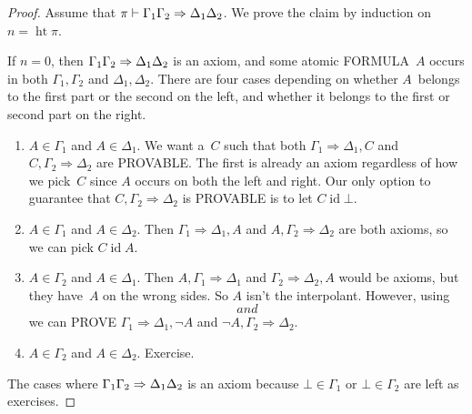 \documentclass[10pt,a4paper]{article}
\newcommand*{\olup}[1]{\MakeUppercase{#1}}
\theoremstyle{plain}
\theoremstyle{definition}
\theoremstyle{remark}
\providecommand{\lfalse}{\bot}
\providecommand{\Sequent}{\mathrel{\Rightarrow}}
\providecommand{\Proves}{\mathrel{\vdash}}
\providecommand{\LeftR}[1]{}
\providecommand{\RightR}[1]{}
\providecommand{\maeh}{\relax}
\providecommand{\pheight}{\operatorname{ht}}
\providecommand{\RightR}{\mathrm{R}}
\providecommand{\LeftR}{\mathrm{L}}
\providecommand{\ident}{\operatorname{id}}
\begin{document}
\begin{proof}
  Assume that $\pi \Proves \maeh{\Gamma_1}{\Gamma_2} \Sequent
  \maeh{\Delta_1}{\Delta_2}$. We prove the claim by induction on
  $n=\pheight{\pi}$.

  If $n=0$, then $\maeh{\Gamma_1}{\Gamma_2} \Sequent
  \maeh{\Delta_1}{\Delta_2}$ is an axiom, and some atomic
  \olup{formula}~$A$ occurs in both $\Gamma_1, \Gamma_2$ and $\Delta_1,
  \Delta_2$. There are four cases depending on whether $A$~belongs to
  the first part or the second on the left, and whether it belongs to
  the first or second part on the right.
  \begin{enumerate}
    \item $A \in \Gamma_1$ and $A \in \Delta_1$. We want a~$C$ such
    that both $\Gamma_1 \Sequent \Delta_1, C$ and $C, \Gamma_2
    \Sequent \Delta_2$ are \olup{provable}. The first is already an axiom
    regardless of how we pick~$C$ since $A$ occurs on both the left
    and right. Our only option to guarantee that $C, \Gamma_2
    \Sequent \Delta_2$ is \olup{provable} is to let $C \ident \lfalse$.
    \item $A \in \Gamma_1$ and $A \in \Delta_2$. Then $\Gamma_1
    \Sequent \Delta_1, A$ and $A, \Gamma_2 \Sequent \Delta_2$ are
    both axioms, so we can pick $C \ident A$.
    \item $A \in \Gamma_2$ and $A \in \Delta_1$. Then $A, \Gamma_1
    \Sequent \Delta_1$ and $\Gamma_2 \Sequent \Delta_2, A$ would be 
    axioms, but they have~$A$ on the wrong sides. So $A$ isn't the
    interpolant. However, using $\RightR{\lnot}$ and $\LeftR{\lnot}$
    we can \olup{prove} $\Gamma_1
    \Sequent \Delta_1, \lnot A$ and $\lnot A, \Gamma_2 \Sequent
    \Delta_2$.
    \item $A \in \Gamma_2$ and $A \in \Delta_2$. Exercise.
  \end{enumerate}
  The cases where $\maeh{\Gamma_1}{\Gamma_2} \Sequent
  \maeh{\Delta_1}{\Delta_2}$ is an axiom because $\lfalse \in
  \Gamma_1$ or $\lfalse \in \Gamma_2$ are left as exercises.


\end{proof}
\end{document}
